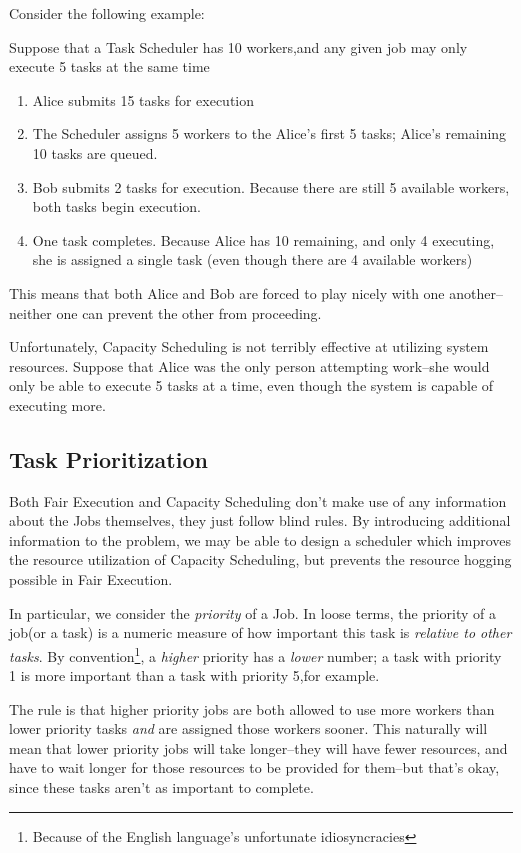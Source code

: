Consider the following example:

\begin{exmp}
Suppose that a Task Scheduler has 10 workers,and any given job may only execute 5 tasks at the same time

\begin{enumerate}
\item Alice submits 15 tasks for execution
\item The Scheduler assigns 5 workers to the Alice's first 5 tasks; Alice's remaining 10 tasks are queued.
\item Bob submits 2 tasks for execution. Because there are still 5 available workers, both tasks begin execution.
\item One task completes. Because Alice has 10 remaining, and only 4 executing, she is assigned a single task (even though there are 4 available workers)
\end{enumerate}
\end{exmp}

This means that both Alice and Bob are forced to play nicely with one another--neither one can prevent the other from proceeding. 

Unfortunately, Capacity Scheduling is not terribly effective at utilizing system resources. Suppose that Alice was the only person attempting work--she would only be able to execute 5 tasks at a time, even though the system is capable of executing more.

\subsection{Task Prioritization}
Both Fair Execution and Capacity Scheduling don't make use of any information about the Jobs themselves, they just follow blind rules. By introducing additional information to the problem, we may be able to design a scheduler which improves the resource utilization of Capacity Scheduling, but prevents the resource hogging possible in Fair Execution.

In particular, we consider the \emph{priority} of a Job. In loose terms, the priority of a job(or a task) is a numeric measure of how important this task is \emph{relative to other tasks}. By convention\footnote{Because of the English language's unfortunate idiosyncracies}, a \emph{higher} priority has a \emph{lower} number; a task with priority 1 is more important than a task with priority 5,for example.

The rule is that higher priority jobs are both allowed to use more workers than lower priority tasks \emph{and} are assigned those workers sooner. This naturally will mean that lower priority jobs will take longer--they will have fewer resources, and have to wait longer for those resources to be provided for them--but that's okay, since these tasks aren't as important to complete.

